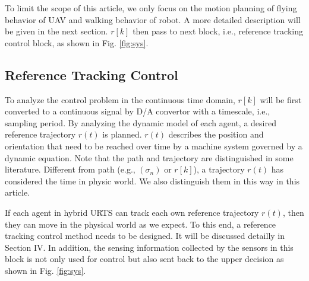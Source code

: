 \documentclass[journal,12pt,onecolumn,draftclsnofoot,]{IEEEtran}
\begin{document}
To limit the scope of this article, we only focus on the motion planning of flying behavior of UAV and walking behavior of robot. A more detailed description will be given in the next section. $r[k]$ then pass to next block, i.e., reference tracking control block, as shown in Fig. \ref{fig:sys}.

\subsection{Reference Tracking Control}
To analyze the control problem in the continuous time domain, $r[k]$ will be first converted to a continuous signal by D/A convertor with a timescale, i.e., sampling period. By analyzing the dynamic model of each agent, a desired reference trajectory $r(t)$ is planned. $r(t)$ describes the position and orientation that need to be reached over time by a machine system governed by a dynamic equation. Note that the path and trajectory are distinguished in some literature. Different from path (e.g., $(\sigma_n)$ or $r[k]$), a trajectory $r(t)$ has considered the time in physic world. We also distinguish them in this way in this article.

If each agent in hybrid URTS can track each own reference trajectory $r(t)$, then they can move in the physical world as we expect. To this end, a reference tracking control method needs to be designed. It will be discussed detailly in Section IV. In addition, the sensing information collected by the sensors in this block is not only used for control but also sent back to the upper decision as shown in Fig. \ref{fig:sys}.
\end{document}
